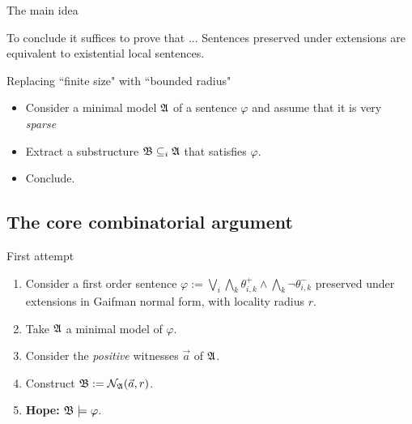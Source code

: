 \documentclass{beamer}
\begin{document}
\begin{frame}{The main idea}
    \begin{alertblock}{To conclude it suffices to prove that ...}
        \vspace{0.1em}
        Sentences preserved under extensions
        are equivalent to existential local sentences.
    \end{alertblock}
    \pause
    \begin{block}{Replacing ``finite size" with ``bounded radius"}
        \vspace{0.1em}
        \begin{itemize}
            \item Consider a minimal model $\mathfrak{A}$ of a sentence $\varphi$
                and assume that it is very \emph{sparse}
            \item Extract a substructure $\mathfrak{B} \mathrel{\subseteq_i} \mathfrak{A}$
                that satisfies $\varphi$.
            \item Conclude.
        \end{itemize}
    \end{block}
\end{frame}

\subsection{The core combinatorial argument}


\begin{frame}{First attempt}
    \begin{enumerate}
        \item 
            Consider a first order sentence \(\varphi := \bigvee_i \bigwedge_k
            \theta_{i,k}^+ \wedge \bigwedge_k \neg \theta_{i,k}^-\) preserved
            under extensions in Gaifman normal form, with locality radius $r$.

        \item
            Take $\mathfrak{A}$ a minimal model of $\varphi$.

        \item 
            Consider the \emph{positive} witnesses $\vec{a}$ of $\mathfrak{A}$.

        \item 
            Construct $\mathfrak{B} := \mathcal{N}_{\mathfrak{A}}(\vec{a}, r)$.

        \item \textbf{Hope:} $\mathfrak{B} \models \varphi$.
    \end{enumerate}
\end{frame}
\end{document}
